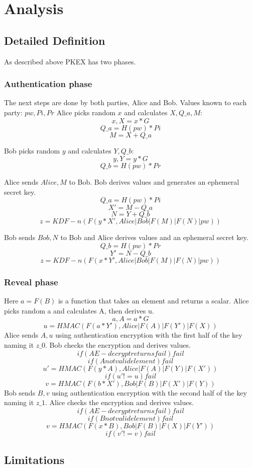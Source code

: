 \section{Analysis}
\subsection{Detailed Definition}
As described above PKEX has two phases.
\subsubsection{Authentication phase}
The next steps are done by both parties, Alice and Bob.
Values known to each party: \(pw, Pi, Pr\)
Alice picks random \(x\) and calculates \(X, Q\_a, M\):
\[x, X = x * G\]
\[Q\_a = H(pw) * Pi\]
\[M = X + Q\_a\]

Bob picks random \(y\) and calculates \(Y, Q\_b\):
\[y, Y = y * G\]
\[Q\_b  = H(pw) * Pr\]

Alice sends \(Alice, M\) to Bob. Bob derives values and generates an ephemeral
secret key.
\[Q\_a = H(pw) * Pi\]
\[X' = M - Q\_a\]
\[N = Y + Q\_b\]
\[z = KDF-n(F(y*X', Alice | Bob | F(M) | F(N) | pw))\]

Bob sends \(Bob, N\) to Bob and Alice derives values and an ephemeral secret key.
\[Q\_b = H(pw) * Pr\]
\[Y' = N - Q\_b\]
\[z = KDF-n(F(x*Y', Alice | Bob | F(M) | F(N) | pw))\]

\subsubsection{Reveal phase}
Here \(a = F(B)\) is a function that takes an element and returns a scalar.
Alice picks random a and calculates A, then derives u. 
\[a, A = a * G \]
\[u = HMAC(F(a * Y'), Alice | F(A) | F(Y') | F(X))\]
Alice sends \(A, u\) using authentication encryption with the first half of the key
naming it \(z\_0\). Bob checks the encryption and derives values. 
\[if (AE-decrypt returns fail) fail\]
\[if (A not valid element) fail\]
\[u' = HMAC(F(y * A), Alice | F(A) | F(Y) | F(X'))\]
\[if (u' != u) fail\]
\[v = HMAC(F(b * X'), Bob | F(B) | F(X') | F(Y))\]
Bob sends \(B, v\) using authentication encryption with the second half of the key
naming it \(z\_1\). Alice checks the encryption and derives values. 
\[if (AE-decrypt returns fail) fail\]
\[if (B not valid element) fail\]
\[v = HMAC(F(x * B), Bob | F(B) | F(X) | F(Y'))\]
\[if (v' != v) fail\]

\subsection{Limitations}


